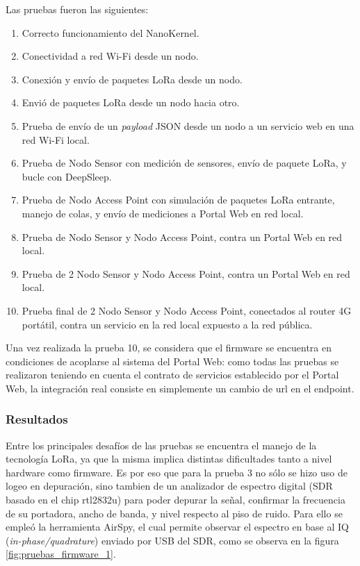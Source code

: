Las pruebas fueron las siguientes:

\begin{enumerate}
    \item Correcto funcionamiento del NanoKernel.
    \item Conectividad a red Wi-Fi desde un nodo.
    \item Conexión y envío de paquetes LoRa desde un nodo.
    \item Envió de paquetes LoRa desde un nodo hacia otro.
    \item Prueba de envío de un \textit{payload} JSON desde un nodo a un servicio web en una red Wi-Fi local.
    \item Prueba de Nodo Sensor con medición de sensores, envío de paquete LoRa, y bucle con DeepSleep.
    \item Prueba de Nodo Access Point  con simulación de paquetes LoRa entrante, manejo de colas, y envío de mediciones a Portal Web en red local.
    \item Prueba de Nodo Sensor y Nodo Access Point, contra un Portal Web en red local.
    \item Prueba de 2 Nodo Sensor y Nodo Access Point, contra un Portal Web en red local.
    \item Prueba final de 2 Nodo Sensor y Nodo Access Point, conectados al router 4G portátil, contra un servicio en la red local expuesto a la red pública.
\end{enumerate}

Una vez realizada la prueba 10, se considera que el firmware se encuentra en condiciones de acoplarse al sistema del Portal Web: como todas las pruebas se realizaron teniendo en cuenta el contrato de servicios establecido por el Portal Web, la integración real consiste en simplemente un cambio de url en el endpoint.

\subsubsection{Resultados}

Entre los principales desafíos de las pruebas se encuentra el manejo de la tecnología LoRa, ya que la misma implica distintas dificultades tanto a nivel hardware como firmware.
Es por eso que para la prueba 3 no sólo se hizo uso de logeo en depuración, sino tambien de un analizador de espectro digital (SDR basado en el chip rtl2832u) para poder depurar la señal, confirmar la frecuencia de su portadora, ancho de banda, y nivel respecto al piso de ruido. Para ello se empleó la herramienta AirSpy, el cual permite observar el espectro en base al IQ (\textit{in-phase/quadrature}) enviado por USB del SDR, como se observa en la figura \ref{fig:pruebas_firmware_1}.

